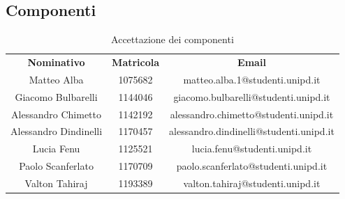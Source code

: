 \newpage

\subsection{Componenti}
	\begin{table} [h!]
		\begin{center}
			\renewcommand{\arraystretch}{3}
			\begin{tabular} { c c c }
				\rowcolor{lightgray}
				\textbf{Nominativo} & \textbf{Matricola} & \textbf{Email} \\
				Matteo Alba & 1075682 & matteo.alba.1@studenti.unipd.it\\
				Giacomo Bulbarelli & 1144046 & giacomo.bulbarelli@studenti.unipd.it\\
				Alessandro Chimetto & 1142192 & alessandro.chimetto@studenti.unipd.it\\
				Alessandro Dindinelli & 1170457 & alessandro.dindinelli@studenti.unipd.it\\
				Lucia Fenu & 1125521 & lucia.fenu@studenti.unipd.it\\
				Paolo Scanferlato & 1170709 & paolo.scanferlato@studenti.unipd.it\\
				Valton Tahiraj & 1193389 & valton.tahiraj@studenti.unipd.it\\
			\end{tabular}
			\caption{Accettazione dei componenti}
		\end{center}
	\end{table}
	






